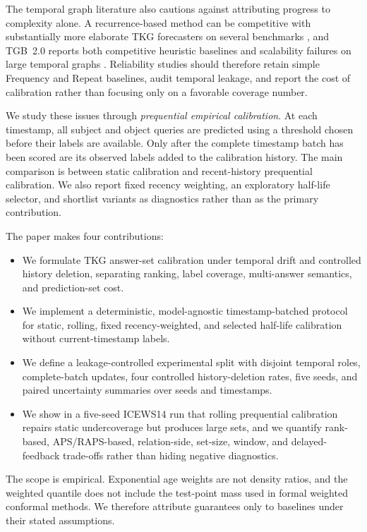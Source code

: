 \documentclass[information,article,submit,oneauthor,pdftex]{Definitions/mdpi}
\begin{document}
The temporal graph literature also cautions against attributing progress to
complexity alone. A recurrence-based method can be competitive with substantially
more elaborate TKG forecasters on several benchmarks
\cite{gastinger2024repeat}, and TGB~2.0 reports both competitive heuristic
baselines and scalability failures on large temporal graphs
\cite{gastinger2024tgb2}. Reliability studies should therefore retain simple
Frequency and Repeat baselines, audit temporal leakage, and report the cost of
calibration rather than focusing only on a favorable coverage number.

We study these issues through \emph{prequential empirical calibration}. At each
timestamp, all subject and object queries are predicted using a threshold chosen
before their labels are available. Only after the complete timestamp batch has
been scored are its observed labels added to the calibration history. The main
comparison is between static calibration and recent-history prequential
calibration. We also report fixed recency weighting, an exploratory half-life
selector, and shortlist variants as diagnostics rather than as the primary
contribution.

The paper makes four contributions:
\begin{itemize}[leftmargin=*]
  \item We formulate TKG answer-set calibration under temporal drift and
  controlled history deletion, separating ranking, label coverage,
  multi-answer semantics, and prediction-set cost.
  \item We implement a deterministic, model-agnostic timestamp-batched protocol
  for static, rolling, fixed recency-weighted, and selected half-life
  calibration without current-timestamp labels.
  \item We define a leakage-controlled experimental split with disjoint temporal
  roles, complete-batch updates, four controlled history-deletion rates, five
  seeds, and paired uncertainty summaries over seeds and timestamps.
  \item We show in a five-seed ICEWS14 run that rolling prequential calibration
  repairs static undercoverage but produces large sets, and we quantify
  rank-based, APS/RAPS-based, relation-side, set-size, window, and
  delayed-feedback trade-offs rather than hiding negative diagnostics.
\end{itemize}

The scope is empirical. Exponential age weights are not density ratios, and the
weighted quantile does not include the test-point mass used in formal weighted
conformal methods. We therefore attribute guarantees only to baselines under
their stated assumptions.
\end{document}
